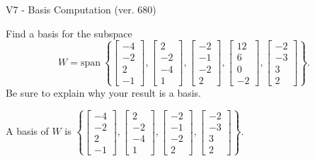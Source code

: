 \begin{exercise}
  \begin{exerciseTitle}V7 - Basis Computation (ver. 680)\end{exerciseTitle}
  \begin{exerciseStatement}
    Find a basis for the subspace 
\[W=\mathrm{span}\ \left\{\left[\begin{array}{r}
-4 \\
-2 \\
2 \\
-1
\end{array}\right] , \left[\begin{array}{r}
2 \\
-2 \\
-4 \\
1
\end{array}\right] , \left[\begin{array}{r}
-2 \\
-1 \\
-2 \\
2
\end{array}\right] , \left[\begin{array}{r}
12 \\
6 \\
0 \\
-2
\end{array}\right] , \left[\begin{array}{r}
-2 \\
-3 \\
3 \\
2
\end{array}\right]\right\}.\]
 Be sure to explain why your result is a basis.


  \end{exerciseStatement}
  \begin{exerciseAnswer}
   A basis of \(W\) is  \(\left\{\left[\begin{array}{r}
-4 \\
-2 \\
2 \\
-1
\end{array}\right] , \left[\begin{array}{r}
2 \\
-2 \\
-4 \\
1
\end{array}\right] , \left[\begin{array}{r}
-2 \\
-1 \\
-2 \\
2
\end{array}\right] , \left[\begin{array}{r}
-2 \\
-3 \\
3 \\
2
\end{array}\right]\right\}\).
  


  \end{exerciseAnswer}
\end{exercise}